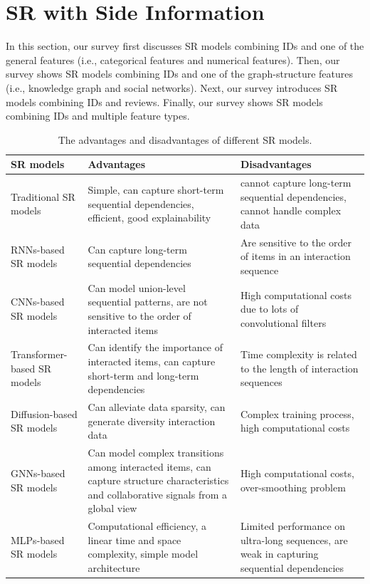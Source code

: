 \documentclass[review]{fcs}
\begin{document}
	\section{SR with Side Information}\label{sec:SR_with_side_information}
	In this section, our survey first discusses SR models combining IDs and one of the general features (i.e., categorical features and numerical features). Then, our survey shows SR models combining IDs and one of the graph-structure features (i.e.,  knowledge graph and social networks). Next, our survey introduces SR models combining IDs and reviews. Finally, our survey shows SR models combining IDs and multiple feature types.
	\begin{table}[h]
		\caption{The advantages and disadvantages of different SR models.}
		\label{tab:different-methods}
		\centering
		\begin{tabular}{p{4cm}p{6cm}p{6cm}}
			\hline
			SR models & Advantages  & Disadvantages\\
			\hline
			Traditional SR models  & Simple, can capture short-term sequential dependencies, efficient, good explainability & cannot capture long-term sequential dependencies, cannot handle complex data \\
			RNNs-based SR models & Can capture long-term sequential dependencies & Are sensitive to the order of items in an interaction sequence\\
			CNNs-based SR models & Can model union-level sequential patterns, are not sensitive to the order of interacted items & High computational costs due to lots of convolutional filters\\
			Transformer-based SR models & Can identify the importance of interacted items, can capture short-term and long-term dependencies & Time complexity is related to the length of interaction sequences\\
			Diffusion-based SR models & Can alleviate data sparsity, can generate diversity interaction data & Complex training process, high computational costs\\
			GNNs-based SR models & Can model complex transitions among interacted items, can capture structure characteristics and collaborative signals from a global view & High computational costs, over-smoothing problem\\
			MLPs-based SR models & Computational efficiency, a linear time and space complexity, simple model architecture &  Limited performance on ultra-long sequences, are weak in capturing sequential dependencies \\

\end{tabular}
\end{table}
\end{document}
